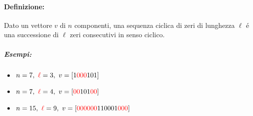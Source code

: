             \paragraph{Definizione:} Dato un vettore $v$ di $n$ componenti, una sequenza ciclica \label{sequenza ciclica}
             di zeri di lunghezza $\ell$ é una successione di $\ell$ zeri consecutivi in senso ciclico.
                \subparagraph{Esempi:}
                    \begin{itemize}
                        \item {$n=7,\ {\color{red}\ell}=3,\ v=[1{\color{red}000}101]$}
                        \item {$n=7,\ {\color{red}\ell}=4,\ v=[{\color{red}00}101{\color{red}00}]$}
                        \item {$n=15,\ {\color{red}\ell}=9,\ v=[{\color{red}000000}110001{\color{red}000}]$}
                    \end{itemize}
